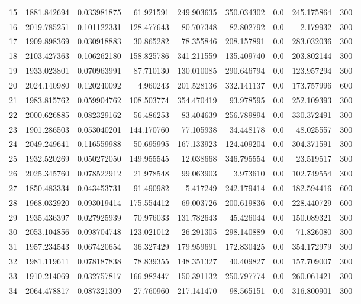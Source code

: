 \begin{longtable}{rrrrrrrrr}
15 & 1881.842694 & 0.033981875 & 61.921591 & 249.903635 & 350.034302 & 0.0 & 245.175864 & 300 \\
16 & 2019.785251 & 0.101122331 & 128.477643 & 80.707348 & 82.802792 & 0.0 & 2.179932 & 300 \\
17 & 1909.898369 & 0.030918883 & 30.865282 & 78.355846 & 208.157891 & 0.0 & 283.032036 & 300 \\
18 & 2103.427363 & 0.106262180 & 158.825786 & 341.211559 & 135.409740 & 0.0 & 203.802144 & 300 \\
19 & 1933.023801 & 0.070963991 & 87.710130 & 130.010085 & 290.646794 & 0.0 & 123.957294 & 300 \\
20 & 2024.140980 & 0.120240092 & 4.960243 & 201.528136 & 332.141137 & 0.0 & 173.757996 & 600 \\
21 & 1983.815762 & 0.059904762 & 108.503774 & 354.470419 & 93.978595 & 0.0 & 252.109393 & 300 \\
22 & 2000.626885 & 0.082329162 & 56.486253 & 83.404639 & 256.789894 & 0.0 & 330.372491 & 300 \\
23 & 1901.286503 & 0.053040201 & 144.170760 & 77.105938 & 34.448178 & 0.0 & 48.025557 & 300 \\
24 & 2049.249641 & 0.116559988 & 50.695995 & 167.133923 & 124.409204 & 0.0 & 304.371591 & 300 \\
25 & 1932.520269 & 0.050272050 & 149.955545 & 12.038668 & 346.795554 & 0.0 & 23.519517 & 300 \\
26 & 2025.345760 & 0.078522912 & 21.978548 & 99.063903 & 3.973610 & 0.0 & 102.749554 & 300 \\
27 & 1850.483334 & 0.043453731 & 91.490982 & 5.417249 & 242.179414 & 0.0 & 182.594416 & 600 \\
28 & 1968.032920 & 0.093019414 & 175.554412 & 69.003726 & 200.619836 & 0.0 & 228.440729 & 600 \\
29 & 1935.436397 & 0.027925939 & 70.976033 & 131.782643 & 45.426044 & 0.0 & 150.089321 & 300 \\
30 & 2053.104856 & 0.098704748 & 123.021012 & 26.291305 & 298.140889 & 0.0 & 71.826080 & 300 \\
31 & 1957.234543 & 0.067420654 & 36.327429 & 179.959691 & 172.830425 & 0.0 & 354.172979 & 300 \\
32 & 1981.119611 & 0.078187838 & 78.839355 & 148.351327 & 40.409827 & 0.0 & 157.709007 & 300 \\
33 & 1910.214069 & 0.032757817 & 166.982447 & 150.391132 & 250.797774 & 0.0 & 260.061421 & 300 \\
34 & 2064.478817 & 0.087321309 & 27.760960 & 217.141470 & 98.565151 & 0.0 & 316.800901 & 300 \\

\end{longtable}

